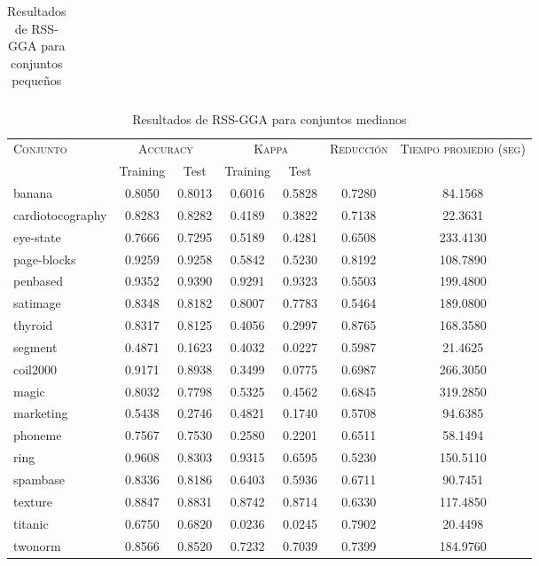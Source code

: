 \begin{table}[]
\begin{tabular}{l c c c c c c}
\hline
\end{tabular}
\caption{Resultados de RSS-GGA para conjuntos pequeños }
\label{res-peq-rss-gga}
\end{table}



\begin{table}[]
\centering
\begin{tabular}{l c c c c c c}
\hline
\multirow{2}{*}{\textsc{Conjunto}}
	& \multicolumn{2}{c}{\textsc{Accuracy}}
	& \multicolumn{2}{c}{\textsc{Kappa}}
	& \textsc{Reducción}
	& \textsc{Tiempo promedio (seg)} \\
	& Training & Test
	& Training & Test \\ 
\hline
\hline

banana & 0.8050 & 0.8013 & 0.6016 & 0.5828 & 0.7280 & 84.1568 \\
cardiotocography & 0.8283 & 0.8282 & 0.4189 & 0.3822 & 0.7138 & 22.3631 \\
eye-state & 0.7666 & 0.7295 & 0.5189 & 0.4281 & 0.6508 & 233.4130 \\
page-blocks & 0.9259 & 0.9258 & 0.5842 & 0.5230 & 0.8192 & 108.7890 \\
penbased & 0.9352 & 0.9390 & 0.9291 & 0.9323 & 0.5503 & 199.4800 \\
satimage & 0.8348 & 0.8182 & 0.8007 & 0.7783 & 0.5464 & 189.0800 \\
thyroid & 0.8317 & 0.8125 & 0.4056 & 0.2997 & 0.8765 & 168.3580 \\
segment & 0.4871 & 0.1623 & 0.4032 & 0.0227 & 0.5987 & 21.4625 \\
coil2000 & 0.9171 & 0.8938 & 0.3499 & 0.0775 & 0.6987 & 266.3050 \\
magic & 0.8032 & 0.7798 & 0.5325 & 0.4562 & 0.6845 & 319.2850 \\
marketing & 0.5438 & 0.2746 & 0.4821 & 0.1740 & 0.5708 & 94.6385 \\
phoneme & 0.7567 & 0.7530 & 0.2580 & 0.2201 & 0.6511 & 58.1494 \\
ring & 0.9608 & 0.8303 & 0.9315 & 0.6595 & 0.5230 & 150.5110 \\
spambase & 0.8336 & 0.8186 & 0.6403 & 0.5936 & 0.6711 & 90.7451 \\
texture & 0.8847 & 0.8831 & 0.8742 & 0.8714 & 0.6330 & 117.4850 \\
titanic & 0.6750 & 0.6820 & 0.0236 & 0.0245 & 0.7902 & 20.4498 \\
twonorm & 0.8566 & 0.8520 & 0.7232 & 0.7039 & 0.7399 & 184.9760 \\

\hline
\end{tabular}
\caption{Resultados de RSS-GGA para conjuntos medianos }
\label{res-med-rss-gga}
\end{table}



